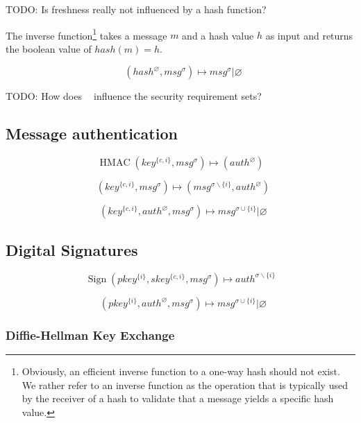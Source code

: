 \documentclass[a4paper]{article}
\DeclareMathOperator{\hashvrfy}{Verify_{Hash}}
\DeclareMathOperator{\hmac}{HMAC}
\DeclareMathOperator{\hmacinline}{HMAC_{Inline}}
\DeclareMathOperator{\hmacvrfy}{Verify_{HMAC}}
\DeclareMathOperator{\sign}{Sign}
\DeclareMathOperator{\signvrfy}{Verify_{Sig}}
\newcommand{\TODO}[1]{\small\noindent\color{red} TODO: #1\color{black}}
\newcommand{\emptysec}{\varnothing}
\newcommand{\secminus}{\smallsetminus}
\begin{document}
\TODO{Is freshness really not influenced by a hash function?}

The inverse function\footnote{Obviously, an efficient inverse function to a
one-way hash should not exist. We rather refer to an inverse function as the
operation that is typically used by the receiver of a hash to validate that a
message yields a specific hash value.} takes a message $m$ and a hash
value $h$ as input and returns the boolean value of $hash(m) = h$.

$$\hashvrfy(hash^\emptysec, msg^\sigma) \mapsto msg^{\sigma} | \emptysec$$

\TODO{How does $\hashvrfy$ influence the security requirement sets?}

\subsection{Message authentication}

$$\hmac(key^{\{c,i\}}, msg^\sigma) \mapsto (auth^{\emptysec})$$

$$\hmacinline(key^{\{c,i\}}, msg^\sigma) \mapsto (msg^{\sigma\secminus{\{i\}}}, auth^{\emptysec})$$

$$\hmacvrfy(key^{\{c,i\}}, auth^\emptysec, msg^\sigma) \mapsto msg^{\sigma\cup\{i\}} | \emptysec$$

%

\subsection{Digital Signatures}

$$\sign(pkey^{\{i\}}, skey^{\{c,i\}}, msg^\sigma) \mapsto auth^{\sigma\secminus\{i\}}$$

$$\signvrfy(pkey^{\{i\}}, auth^{\emptysec}, msg^\sigma) \mapsto msg^{\sigma\cup\{i\}} | \emptysec$$

\subsubsection{Diffie-Hellman Key Exchange}
\end{document}
